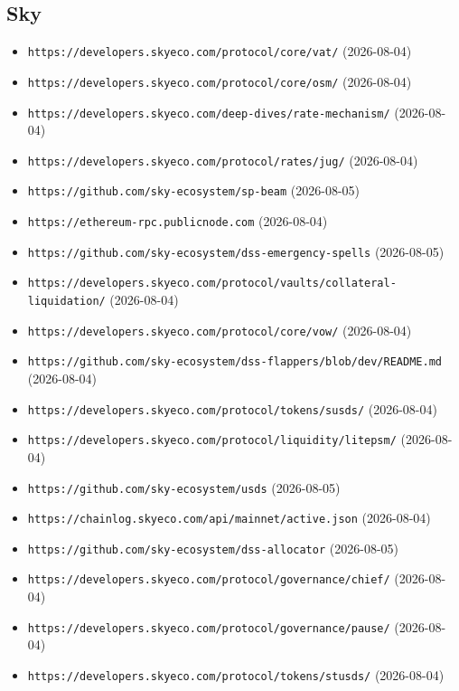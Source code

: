 \subsection*{Sky}
\begin{itemize}\setlength{\itemsep}{0pt}\small
\item \texttt{https://developers.skyeco.com/protocol/core/vat/} (2026-08-04)
\item \texttt{https://developers.skyeco.com/protocol/core/osm/} (2026-08-04)
\item \texttt{https://developers.skyeco.com/deep-dives/rate-mechanism/} (2026-08-04)
\item \texttt{https://developers.skyeco.com/protocol/rates/jug/} (2026-08-04)
\item \texttt{https://github.com/sky-ecosystem/sp-beam} (2026-08-05)
\item \texttt{https://ethereum-rpc.publicnode.com} (2026-08-04)
\item \texttt{https://github.com/sky-ecosystem/dss-emergency-spells} (2026-08-05)
\item \texttt{https://developers.skyeco.com/protocol/vaults/collateral-liquidation/} (2026-08-04)
\item \texttt{https://developers.skyeco.com/protocol/core/vow/} (2026-08-04)
\item \texttt{https://github.com/sky-ecosystem/dss-flappers/blob/dev/README.md} (2026-08-04)
\item \texttt{https://developers.skyeco.com/protocol/tokens/susds/} (2026-08-04)
\item \texttt{https://developers.skyeco.com/protocol/liquidity/litepsm/} (2026-08-04)
\item \texttt{https://github.com/sky-ecosystem/usds} (2026-08-05)
\item \texttt{https://chainlog.skyeco.com/api/mainnet/active.json} (2026-08-04)
\item \texttt{https://github.com/sky-ecosystem/dss-allocator} (2026-08-05)
\item \texttt{https://developers.skyeco.com/protocol/governance/chief/} (2026-08-04)
\item \texttt{https://developers.skyeco.com/protocol/governance/pause/} (2026-08-04)
\item \texttt{https://developers.skyeco.com/protocol/tokens/stusds/} (2026-08-04)
\end{itemize}

